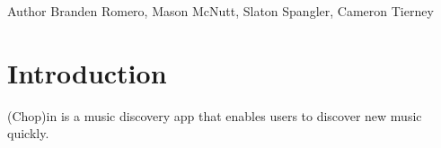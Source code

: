 \begin{DoxyAuthor}{Author}
Branden Romero, Mason Mc\+Nutt, Slaton Spangler, Cameron Tierney 
\end{DoxyAuthor}
\hypertarget{index_intro}{}\section{Introduction}\label{index_intro}
(Chop)in is a music discovery app that enables user\textquotesingle{}s to discover new music quickly. 